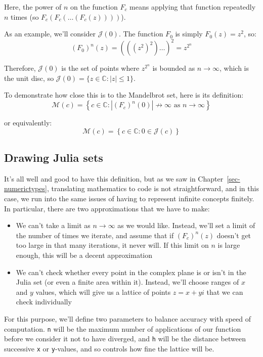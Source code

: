 \documentclass[
  letterpaper,
  DIV=11,
  numbers=noendperiod]{scrreprt}
\begin{document}
Here, the power of \(n\) on the function \(F_c\) means applying that
function repeatedly \(n\) times (so \(F_c(F_c(\dots(F_c(z))))\)).

As an example, we'll consider \(\mathcal{J}(0)\). The function \(F_0\)
is simply \(F_0(z) = z^2\), so: \[
(F_0)^n(z) = (((z^2)^2)\dots)^2 = z^{2^n}
\]

Therefore, \(\mathcal{J}(0)\) is the set of points where \(z^{2^n}\) is
bounded as \(n \to \infty\), which is the unit disc, so
\(\mathcal{J}(0) = \{ z \in \mathbb{C} : |z| \leqslant 1 \}\).

To demonstrate how close this is to the Mandelbrot set, here is its
definition: \[
\mathcal{M}(c) = \left\{ c \in \mathbb{C} : \left| (F_c)^n(0) \right| \not\to \infty \text{ as } n \to \infty \right\}
\]

or equivalently: \[
\mathcal{M}(c) = \left\{ c \in \mathbb{C} : 0 \in \mathcal{J}(c) \right\}
\]

\hypertarget{drawing-julia-sets}{%
\subsection{Drawing Julia sets}\label{drawing-julia-sets}}

It's all well and good to have this definition, but as we saw in
Chapter~\ref{sec-numerictypes}, translating mathematics to code is not
straightforward, and in this case, we run into the same issues of having
to represent infinite concepts finitely. In particular, there are two
approximations that we have to make:

\begin{itemize}
\item
  We can't take a limit as \(n \to \infty\) as we would like. Instead,
  we'll set a limit of the number of times we iterate, and assume that
  if \((F_c)^n(z)\) doesn't get too large in that many iterations, it
  never will. If this limit on \(n\) is large enough, this will be a
  decent approximation
\item
  We can't check whether every point in the complex plane is or isn't in
  the Julia set (or even a finite area within it). Instead, we'll choose
  ranges of \(x\) and \(y\) values, which will give us a lattice of
  points \(z = x + yi\) that we can check individually
\end{itemize}

For this purpose, we'll define two parameters to balance accuracy with
speed of computation. \texttt{n} will be the maximum number of
applications of our function before we consider it not to have diverged,
and \texttt{h} will be the distance between successive \texttt{x} or
\texttt{y}-values, and so controls how fine the lattice will be.
\end{document}
